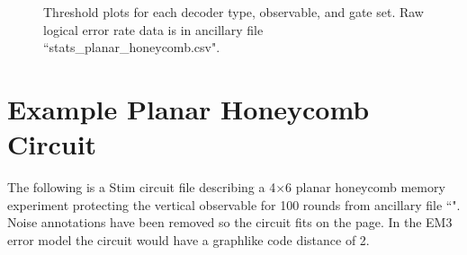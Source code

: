 \documentclass[onecolumn,unpublished,a4paper]{quantumarticle}
\theoremstyle{definition}
\theoremstyle{definition}
\theoremstyle{definition}
\begin{document}
\begin{figure}
    \centering
    \caption{
        Threshold plots for each decoder type, observable, and gate set.
        Raw logical error rate data is in ancillary file ``stats\_planar\_honeycomb.csv".
    }
    \label{fig:threshold_breakdown}
\end{figure}

\clearpage
\section{Example Planar Honeycomb Circuit}
\label{app:example_circuit}

The following is a Stim circuit file \cite{stimcircuitformat} describing a 4$\times$6 planar honeycomb memory experiment protecting the vertical observable for 100 rounds from ancillary file ``".
Noise annotations have been removed so the circuit fits on the page.
In the EM3 error model the circuit would have a graphlike code distance of 2.
\end{document}
